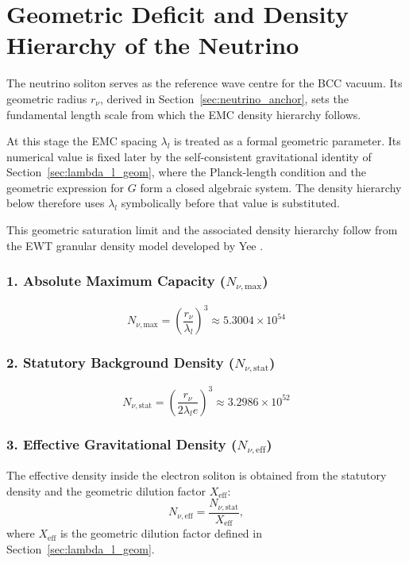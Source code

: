 \documentclass[10pt,a4paper]{article}
\begin{document}
\section{Geometric Deficit and Density Hierarchy of the Neutrino}
\label{sec:source_grav_epsg}

The neutrino soliton serves as the reference wave centre for the BCC vacuum. Its geometric radius \(r_\nu\), derived in Section~\ref{sec:neutrino_anchor}, sets the fundamental length scale from which the EMC density hierarchy follows.

At this stage the EMC spacing \(\lambda_l\) is treated as a formal geometric parameter. Its numerical value is fixed later by the self-consistent gravitational identity of Section~\ref{sec:lambda_l_geom}, where the Planck-length condition and the geometric expression for \(G\) form a closed algebraic system. The density hierarchy below therefore uses \(\lambda_l\) symbolically before that value is substituted.

This geometric saturation limit and the associated density hierarchy follow from the EWT granular density model developed by Yee \cite{yee2019spacetime}.

\subsubsection*{1. Absolute Maximum Capacity (\(N_{\nu,\text{max}}\))}
\begin{equation}
	N_{\nu,\text{max}} = \left( \frac{r_\nu}{\lambda_l} \right)^3 \approx 5.3004 \times 10^{54}
	\label{eq:N_nu_max}
\end{equation}

\subsubsection*{2. Statutory Background Density (\(N_{\nu,\text{stat}}\))}
\begin{equation}
	N_{\nu,\text{stat}} = \left( \frac{r_\nu}{2 \lambda_l e} \right)^3 \approx 3.2986 \times 10^{52}
	\label{eq:N_nu_stat}
\end{equation}

\subsubsection*{3. Effective Gravitational Density (\(N_{\nu,\text{eff}}\))}
The effective density inside the electron soliton is obtained from the statutory density and the geometric dilution factor \(X_{\text{eff}}\):
\begin{equation}
	N_{\nu,\text{eff}} = \frac{N_{\nu,\text{stat}}}{X_{\text{eff}}},
	\label{eq:N_nu_effective}
\end{equation}
where \(X_{\text{eff}}\) is the geometric dilution factor defined in Section~\ref{sec:lambda_l_geom}.
\end{document}
